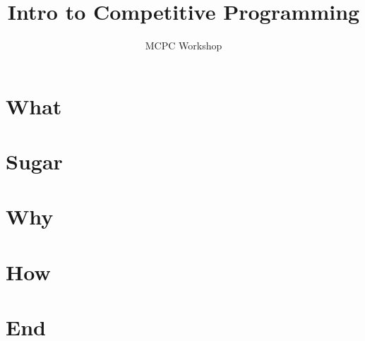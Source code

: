 \documentclass{beamer}
\title[Monash Competitive Programming Club]{Intro to Competitive Programming}
\subtitle {MCPC Workshop}
\date{}
\author[Eggeek (Shizhe Zhao)]{
}
\begin{document}

\frame{\titlepage}
\section[]{}

\section{What}

\section{Sugar}

\section{Why}

\section{How}

\section{End}

\end{document}
